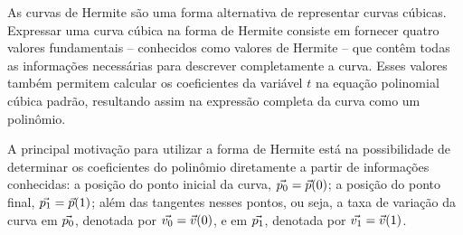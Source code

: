 As curvas de Hermite são uma forma alternativa de representar curvas cúbicas. Expressar uma curva cúbica na forma de Hermite consiste em fornecer quatro valores fundamentais -- conhecidos como valores de Hermite -- que contêm todas as informações necessárias para descrever completamente a curva. Esses valores também permitem calcular os coeficientes da variável \( t \) na equação polinomial cúbica padrão, resultando assim na expressão completa da curva como um polinômio.

A principal motivação para utilizar a forma de Hermite está na possibilidade de determinar os coeficientes do polinômio diretamente a partir de informações conhecidas: a posição do ponto inicial da curva, \( {\vec{p_0}} = {\vec{p}}(0) \); a posição do ponto final, \( {\vec{p_1}} = {\vec{p}}(1) \); além das tangentes nesses pontos, ou seja, a taxa de variação da curva em \( {\vec{p_0}} \), denotada por \( {\vec{v_0}} = {\vec{v}}(0) \), e em \( {\vec{p_1}} \), denotada por \( {\vec{v_1}} = {\vec{v}}(1) \).


